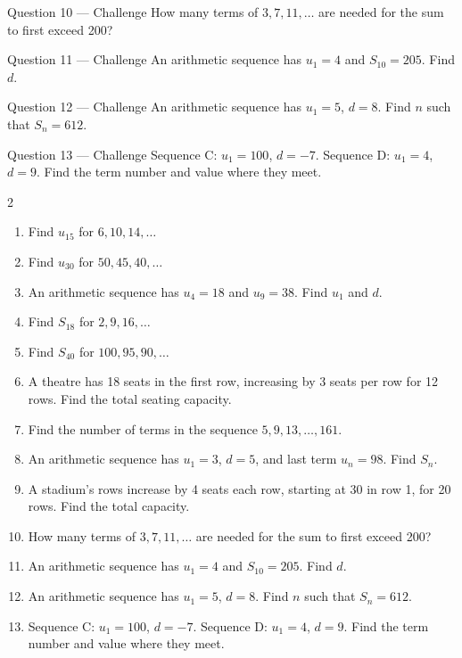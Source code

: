 \documentclass[11pt]{article}
\begin{document}
\begin{qbox}{Question 10 --- Challenge}
How many terms of $3,7,11,\dots$ are needed for the sum to first exceed 200?\workspace{3.2cm}
\end{qbox}

\begin{qbox}{Question 11 --- Challenge}
An arithmetic sequence has $u_1=4$ and $S_{10}=205$. Find $d$.\workspace{3.2cm}
\end{qbox}

\begin{qbox}{Question 12 --- Challenge}
An arithmetic sequence has $u_1=5$, $d=8$. Find $n$ such that $S_n=612$.\workspace{3.4cm}
\end{qbox}

\begin{qbox}{Question 13 --- Challenge}
Sequence C: $u_1=100$, $d=-7$. Sequence D: $u_1=4$, $d=9$. Find the term number and value where they meet.\workspace{3.4cm}
\end{qbox}

\clearpage
{}

\begin{recapbox}
\begin{multicols}{2}
\small
\begin{enumerate}[leftmargin=*,itemsep=3pt]
  \item Find $u_{15}$ for $6,10,14,\dots$
  \item Find $u_{30}$ for $50,45,40,\dots$
  \item An arithmetic sequence has $u_4=18$ and $u_9=38$. Find $u_1$ and $d$.
  \item Find $S_{18}$ for $2,9,16,\dots$
  \item Find $S_{40}$ for $100,95,90,\dots$
  \item A theatre has 18 seats in the first row, increasing by 3 seats per row for 12 rows. Find the total seating capacity.
  \item Find the number of terms in the sequence $5,9,13,\dots,161$.
  \item An arithmetic sequence has $u_1=3$, $d=5$, and last term $u_n=98$. Find $S_n$.
  \item A stadium's rows increase by 4 seats each row, starting at 30 in row 1, for 20 rows. Find the total capacity.
  \item How many terms of $3,7,11,\dots$ are needed for the sum to first exceed 200?
  \item An arithmetic sequence has $u_1=4$ and $S_{10}=205$. Find $d$.
  \item An arithmetic sequence has $u_1=5$, $d=8$. Find $n$ such that $S_n=612$.
  \item Sequence C: $u_1=100$, $d=-7$. Sequence D: $u_1=4$, $d=9$. Find the term number and value where they meet.
\end{enumerate}
\end{multicols}
\end{recapbox}
\end{document}
